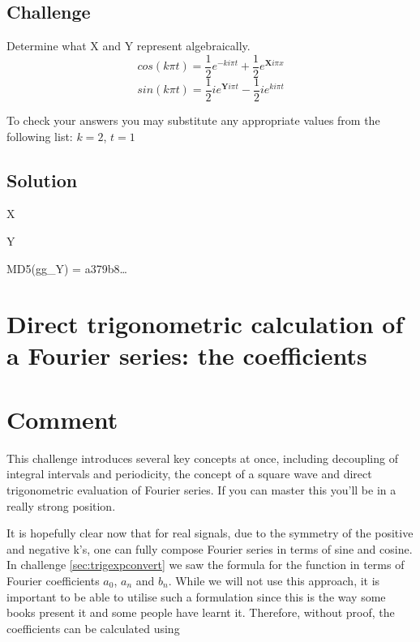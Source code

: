 \subsection*{Challenge}
Determine what X and Y represent algebraically.
\begin{equation}
    cos(k \pi t) = \frac{1}{2} e^{-k i\pi t} + \frac{1}{2} e^{\bm{X} i \pi x}
\end{equation}
\begin{equation}
    sin(k \pi t) = \frac{1}{2} i e^{\bm{Y} i \pi t} - \frac{1}{2} i e^{k i \pi t}
\end{equation}

To check your answers you may substitute any appropriate values from the following list: $k=2$, $t=1$

\subsection*{Solution}
X


Y

MD5(gg\_Y) = a379b8\ldots

\timebox




\newpage
\section{Direct trigonometric calculation of a Fourier series: the coefficients}
\label{sec:fs_squarewave}

\section*{Comment}
This challenge introduces several key concepts at once, including decoupling of integral intervals and periodicity, the concept of a square wave and direct trigonometric evaluation of Fourier series. If you can master this you'll be in a really strong position.

It is hopefully clear now that for real signals, due to the symmetry of the positive and negative k's, one can fully compose Fourier series in terms of sine and cosine. In challenge \ref{sec:trigexpconvert} we saw the formula for the function in terms of Fourier coefficients $a_0$, $a_n$ and $b_n$. While we will not use this approach, it is important to be able to utilise such a formulation since this is the way some books present it and some people have learnt it. Therefore, without proof, the coefficients can be calculated using

